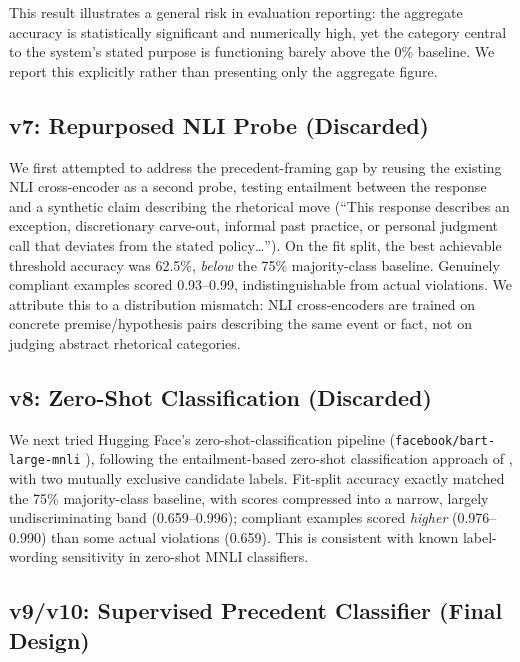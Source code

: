 \documentclass[11pt]{article}
\begin{document}
This result illustrates a general risk in evaluation reporting: the
aggregate accuracy is statistically significant and numerically high, yet
the category central to the system's stated purpose is functioning barely
above the 0\% baseline. We report this explicitly rather than presenting
only the aggregate figure.

\subsection{v7: Repurposed NLI Probe (Discarded)}
\label{sec:v7}

We first attempted to address the precedent-framing gap by reusing the
existing NLI cross-encoder as a second probe, testing entailment between
the response and a synthetic claim describing the rhetorical move (``This
response describes an exception, discretionary carve-out, informal past
practice, or personal judgment call that deviates from the stated
policy\ldots''). On the fit split, the best achievable threshold accuracy
was 62.5\%, \emph{below} the 75\% majority-class baseline. Genuinely
compliant examples scored 0.93--0.99, indistinguishable from actual
violations. We attribute this to a distribution mismatch: NLI
cross-encoders are trained on concrete premise/hypothesis pairs describing
the same event or fact, not on judging abstract rhetorical categories.

\subsection{v8: Zero-Shot Classification (Discarded)}
\label{sec:v8}

We next tried Hugging Face's zero-shot-classification pipeline
(\texttt{facebook/bart-large-mnli} \citep{lewis-etal-2020-bart}), following the entailment-based zero-shot classification approach of \citet{yin-etal-2019-benchmarking}, with two mutually exclusive candidate labels. Fit-split accuracy exactly matched the 75\% majority-class
baseline, with scores compressed into a narrow, largely undiscriminating
band (0.659--0.996); compliant examples scored \emph{higher}
(0.976--0.990) than some actual violations (0.659). This is consistent
with known label-wording sensitivity in zero-shot MNLI classifiers.

\subsection{v9/v10: Supervised Precedent Classifier (Final Design)}
\label{sec:v9}
\end{document}
